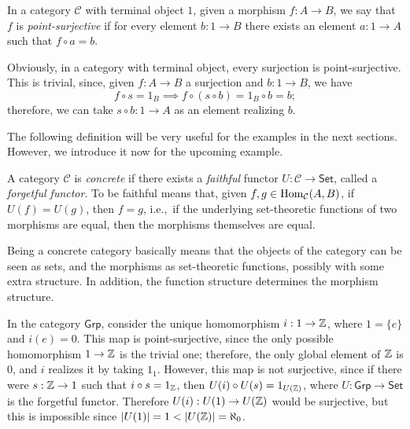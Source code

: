 \begin{definition}
    In a category $\mathcal C$ with terminal object $1$, given a morphism $f: A \to B$, we say that $f$ is \emph{point-surjective} if for every
    element $b: 1 \to B$ there exists an element $a: 1 \to A$ such that $f \circ a = b$.
\end{definition}

\begin{remark}
    Obviously, in a category with terminal object, every surjection is point-surjective. This is trivial, since, given $f: A \to B$ a surjection and $b: 1 \to B$, we have
    \[ f \circ s = 1_B \implies f \circ (s \circ b) = 1_B \circ b = b; \]
    therefore, we can take $s \circ b : 1 \to A$ as an element realizing $b$.
\end{remark}

The following definition will be very useful for the examples in the next sections. However, we introduce it now for the upcoming example.

\begin{definition}
    A category $\mathcal C$ is \emph{concrete} if there exists a \emph{faithful} functor $U : \mathcal C \to \mathsf{Set}$, called a \emph{forgetful functor}.
    To be faithful means that, given $f,g \in \operatorname{Hom}_{\mathcal C}(A,B)$, if $U(f) = U(g)$, then $f = g$, i.e.,\ if the underlying set-theoretic functions of two morphisms are equal, then the morphisms themselves are equal.
\end{definition}

Being a concrete category basically means that the objects of the category can be seen as sets, and the morphisms as set-theoretic functions, possibly with some extra structure.
In addition, the function structure determines the morphism structure.

\begin{example}
    In the category $\mathsf{Grp}$, consider the unique homomorphism $i : 1 \to \mathbb{Z}$, where $1 = \{e\}$ and $i(e) = 0$. This map is point-surjective, since
    the only possible homomorphism $1 \to \mathbb{Z}$ is the trivial one; therefore, the only global element of $\mathbb{Z}$ is $0$, and $i$ realizes it by taking $1_1$.
    However, this map is not surjective, since if there were $s : \mathbb{Z} \to 1$ such that $i \circ s = 1_{\mathbb{Z}}$, then $U(i) \circ U(s) = 1_{U(\mathbb{Z})}$, where $U : \mathsf{Grp} \to \mathsf{Set}$ is the forgetful functor.
    Therefore $U(i) : U(1) \to U(\mathbb{Z})$ would be surjective, but this is impossible since $|U(1)| = 1 < |U(\mathbb{Z})| = \aleph_0$.
\end{example}

